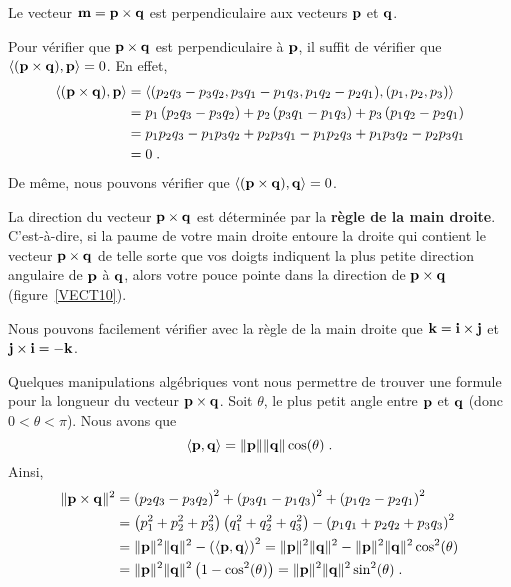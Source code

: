 {\begin{prop}
Le vecteur $\mathbf{m} = \mathbf{p} \times \mathbf{q}$ est
perpendiculaire aux vecteurs $\mathbf{p}$ et $\mathbf{q}$.
\end{prop}

Pour vérifier que $\mathbf{p} \times \mathbf{q}$ est perpendiculaire à
$\mathbf{p}$, il suffit de vérifier que
$\left\langle{(\mathbf{p} \times \mathbf{q})} , {\mathbf{p}}\right\rangle = 0$.  En effet,
\begin{align*}
\left\langle{(\mathbf{p} \times \mathbf{q})} , {\mathbf{p}}\right\rangle &=
\left\langle{ \left(p_2 q_3 - p_3 q_2, p_3 q_1 - p_1 q_3,
p_1 q_2 - p_2 q_1\right)} , {(p_1,p_2,p_3)}\right\rangle \\
&= p_1\left(p_2 q_3 - p_3 q_2\right) + p_2\left(p_3 q_1 - p_1 q_3\right)
+ p_3\left(p_1 q_2 - p_2 q_1\right) \\
&= p_1 p_2 q_3 - p_1 p_3 q_2 + p_2 p_3 q_1 - p_1 p_2 q_3
+ p_1 p_3 q_2 - p_2 p_3 q_1 \\
&= 0 \; .
\end{align*}
De même, nous pouvons vérifier que
$\left\langle{(\mathbf{p} \times \mathbf{q})} , {\mathbf{q}}\right\rangle = 0$.

\begin{defn} 
La direction du vecteur $\mathbf{p} \times \mathbf{q}$ est déterminée par la
{\bfseries règle de la main droite}.  C'est-à-dire, si la paume de
votre main droite entoure la droite qui contient le vecteur
$\mathbf{p} \times \mathbf{q}$ de telle sorte que vos doigts indiquent la
plus petite direction angulaire de $\mathbf{p}$ à $\mathbf{q}$, alors votre
pouce pointe dans la direction de $\mathbf{p} \times \mathbf{q}$
(figure~\ref{VECT10}).
\end{defn}


\begin{egg}
Nous pouvons facilement vérifier avec la règle de la main droite que
$\mathbf{k} = \mathbf{i} \times \mathbf{j}$ et $\mathbf{j} \times \mathbf{i} = -\mathbf{k}$.
\end{egg}

Quelques manipulations algébriques vont nous permettre de trouver une
formule pour la longueur du vecteur $\mathbf{p} \times \mathbf{q}$.
Soit $\theta$, le plus petit angle entre $\mathbf{p}$ et $\mathbf{q}$
(donc $0 < \theta < \pi$).  Nous avons que
\[
\left\langle{\mathbf{p}} , {\mathbf{q}}\right\rangle = \|\mathbf{p}\| \|\mathbf{q}\| \cos(\theta)  \; .
\]
Ainsi,
\begin{align*}
\| \mathbf{p} \times \mathbf{q} \|^2 &= 
\left(p_2 q_3 - p_3 q_2\right)^2 + \left(p_3 q_1 - p_1 q_3\right)^2
+ \left(p_1 q_2 - p_2 q_1\right)^2 \\
&= \left(p_1^2+p_2^2+p_3^2\right)\left(q_1^2+q_2^2+q_3^2\right)
-\left(p_1q_1+p_2q_2+p_3q_3\right)^2 \\
&= \|\mathbf{p}\|^2 \|\mathbf{q}\|^2
- \left( \left\langle{\mathbf{p}} , {\mathbf{q}}\right\rangle \right)^2
= \|\mathbf{p}\|^2 \|\mathbf{q}\|^2
- \|\mathbf{p}\|^2 \|\mathbf{q}\|^2\cos^2(\theta) \\
&= \|\mathbf{p}\|^2 \|\mathbf{q}\|^2 \left( 1 - \cos^2(\theta)\right)
= \|\mathbf{p}\|^2 \|\mathbf{q}\|^2 \sin^2(\theta) \; .
\end{align*}

}

